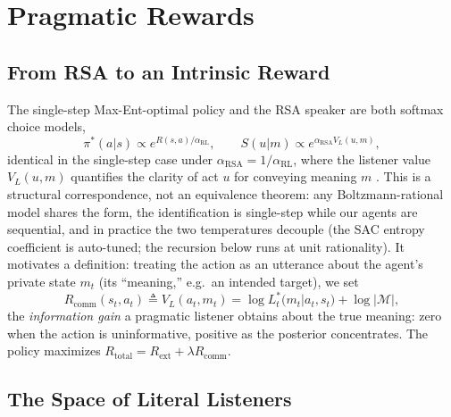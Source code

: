 \documentclass[sigconf,review,anonymous]{acmart}
\newcommand{\Rcomm}{R_{\text{comm}}}
\newcommand{\Rext}{R_{\text{ext}}}
\newcommand{\Rtotal}{R_{\text{total}}}
\newcommand{\VL}{V_L}
\newcommand{\AlphaRL}{\alpha_{\text{RL}}}
\newcommand{\AlphaRSA}{\alpha_{\text{RSA}}}
\begin{document}
\section{Pragmatic Rewards}
\label{sec:pragmatic_reward}

\subsection{From RSA to an Intrinsic Reward}
\label{ssec:derivation}

The single-step Max-Ent-optimal policy and the RSA speaker are both softmax choice models,
\begin{equation}
\pi^{*}(a|s)\propto e^{R(s,a)/\AlphaRL}, \qquad
S(u|m)\propto e^{\AlphaRSA \VL(u,m)},
\label{eq:softmaxes}
\end{equation}
identical in the single-step case under $\AlphaRSA = 1/\AlphaRL$, where the listener value $\VL(u,m)$ quantifies the clarity of act $u$ for conveying meaning $m$ \cite{goodman2016pragmatic,haarnoja2018soft,levine2018reinforcement}. This is a structural correspondence, not an equivalence theorem: any Boltzmann-rational model shares the form, the identification is single-step while our agents are sequential, and in practice the two temperatures decouple (the SAC entropy coefficient is auto-tuned; the recursion below runs at unit rationality). It motivates a definition: treating the action as an utterance about the agent's private state $m_t$ (its ``meaning,'' e.g.\ an intended target), we set
\begin{equation}
\Rcomm(s_t, a_t) \triangleq \VL(a_t, m_t) = \log L^*_t(m_t|a_t, s_t) + \log|\mathcal{M}|,
\label{eq:comm_reward_def}
\end{equation}
the \emph{information gain} a pragmatic listener obtains about the true meaning: zero when the action is uninformative, positive as the posterior concentrates. The policy maximizes $\Rtotal = \Rext + \lambda \Rcomm$.

\subsection{The Space of Literal Listeners}
\label{ssec:listeners}
\end{document}
